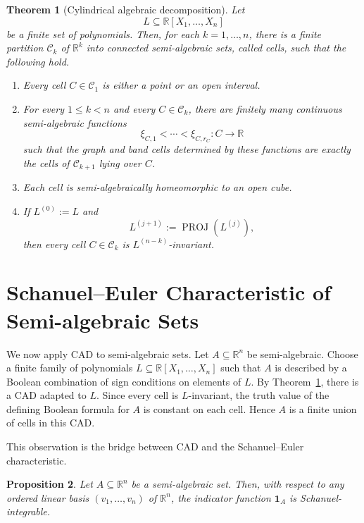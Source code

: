 \documentclass[11pt]{article}
\newtheorem{theorem}{Theorem}[section]
\newtheorem{proposition}[theorem]{Proposition}
\theoremstyle{remark}
\newcommand{\1}{\mathbf 1}
\begin{document}
\begin{theorem}[Cylindrical algebraic decomposition]
\label{thm:cad}
Let
\[
  L\subseteq \mathbb{R}[X_1,\ldots,X_n]
\]
be a finite set of polynomials.  Then, for each \(k=1,\ldots,n\), there is a
finite partition \(\mathcal{C}_k\) of \(\mathbb{R}^k\) into connected
semi-algebraic sets, called cells, such that the following hold.

\begin{enumerate}
  \item Every cell \(C\in \mathcal{C}_1\) is either a point or an open interval.

  \item For every \(1\leq k<n\) and every \(C\in \mathcal{C}_k\), there are
  finitely many continuous semi-algebraic functions
  \[
    \xi_{C,1}<\cdots<\xi_{C,r_C}:C\longrightarrow \mathbb{R}
  \]
  such that the graph and band cells determined by these functions are exactly
  the cells of \(\mathcal{C}_{k+1}\) lying over \(C\).

  \item Each cell is semi-algebraically homeomorphic to an open cube.

  \item If \(L^{(0)}:=L\) and
  \[
    L^{(j+1)}:=\operatorname{PROJ}(L^{(j)}),
  \]
  then every cell \(C\in \mathcal{C}_k\) is \(L^{(n-k)}\)-invariant.
\end{enumerate}
\end{theorem}




\section{Schanuel--Euler Characteristic of Semi-algebraic Sets}
We now apply CAD to semi-algebraic sets.  Let
\(A\subseteq \mathbb{R}^n\) be semi-algebraic.  Choose a finite family of
polynomials \(L\subseteq \mathbb{R}[X_1,\ldots,X_n]\) such that \(A\) is
described by a Boolean combination of sign conditions on elements of \(L\).
By Theorem~\ref{thm:cad}, there is a CAD adapted to \(L\).  Since every cell is
\(L\)-invariant, the truth value of the defining Boolean formula for \(A\) is
constant on each cell.  Hence \(A\) is a finite union of cells in this CAD.

This observation is the bridge between CAD and the Schanuel--Euler
characteristic.

\begin{proposition}
\label{prop:semialgebraic-indicator-schanuel-integrable}
Let \(A\subseteq \mathbb{R}^n\) be a semi-algebraic set.  Then, with respect to
any ordered linear basis \((v_1,\ldots,v_n)\) of \(\mathbb{R}^n\), the
indicator function \(\mathbf{1}_A\) is Schanuel-integrable.
\end{proposition}
\end{document}

